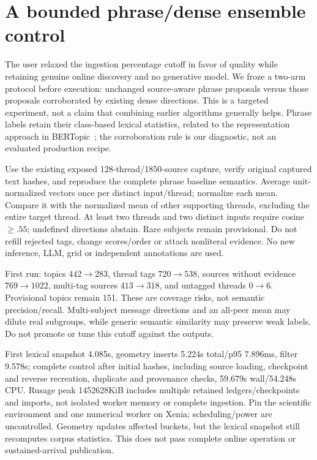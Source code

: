 \documentclass[11pt]{article}
\begin{document}
\section{A bounded phrase/dense ensemble control}
The user relaxed the ingestion percentage cutoff in favor of quality while
retaining genuine online discovery and no generative model. We froze a two-arm
protocol before execution: unchanged source-aware phrase proposals versus those
proposals corroborated by existing dense directions. This is a targeted
experiment, not a claim that combining earlier algorithms generally helps.
Phrase labels retain their class-based lexical statistics, related to the
representation approach in BERTopic~\cite{bertopic}; the corroboration rule is
our diagnostic, not an evaluated production recipe.

Use the existing exposed 128-thread/1850-source capture, verify original captured
text hashes, and reproduce the complete phrase baseline semantics. Average
unit-normalized vectors once per distinct input/thread; normalize each mean.
Compare it with the normalized mean of other supporting threads, excluding
the entire target thread. At least two threads and two distinct inputs require
cosine $\geq.55$; undefined directions abstain. Rare subjects remain provisional.
Do not refill rejected tags, change scores/order or attach nonliteral evidence.
No new inference, LLM, grid or independent annotations are used.

First run: topics $442\to283$, thread tags $720\to538$,
sources without evidence $769\to1022$, multi-tag sources $413\to318$,
and untagged threads $0\to6$. Provisional topics remain 151. These are coverage
risks, not semantic precision/recall. Multi-subject message directions and an
all-peer mean may dilute real subgroups, while generic semantic similarity may
preserve weak labels. Do not promote or tune this cutoff against the outputs.

First lexical snapshot 4.085s, geometry inserts 5.224s total/p95 $7.896$ms,
filter 9.578s; complete control after initial hashes, including source loading,
checkpoint and reverse recreation, duplicate and provenance checks,
59.679s wall/54.248s CPU. Rusage peak 1452628KiB
includes multiple retained ledgers/checkpoints and imports, not isolated worker
memory or complete ingestion. Pin the scientific environment and one numerical
worker on Xenia; scheduling/power are uncontrolled. Geometry updates affected
buckets, but the lexical snapshot still recomputes corpus statistics. This does
not pass complete online operation or sustained-arrival publication.
\end{document}
